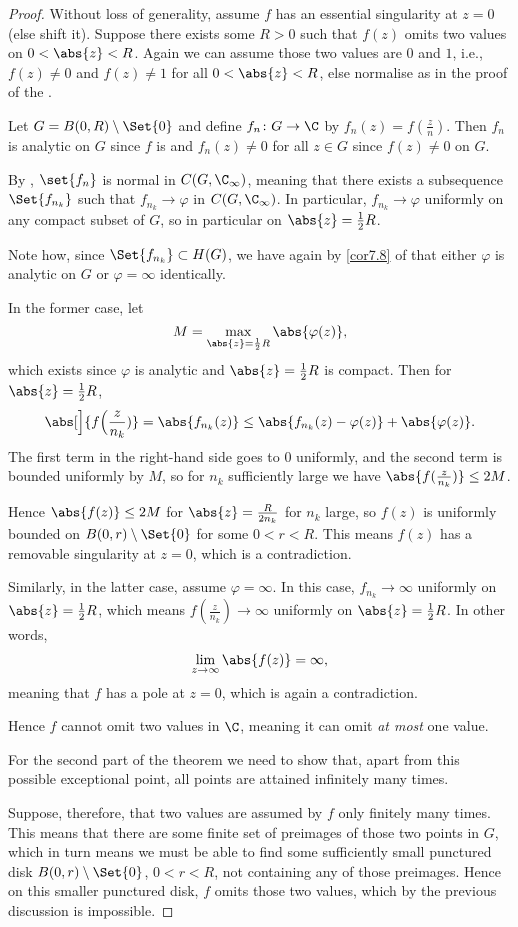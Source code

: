\begin{proof}
	Without loss of generality, assume $f$ has an essential singularity at $z = 0$ (else shift it).
	Suppose there exists some $R > 0$ such that $f(z)$ omits two values on $0 < \abs{z} < R$.
	Again we can assume those two values are $0$ and $1$, i.e., $f(z) \neq 0$ and $f(z) \neq 1$ for all $0 < \abs{z} < R$, else normalise as in the proof of the .

	Let $G = B(0, R) \setminus \Set{0}$ and define $f_n \colon G \to \C$ by $f_n(z) = f(\frac{z}{n})$.
	Then $f_n$ is analytic on $G$ since $f$ is and $f_n(z) \neq 0$ for all $z \in G$ since $f(z) \neq 0$ on $G$.

	By , $\set{f_n}$ is normal in $C(G, \C_\infty)$, meaning that there exists a subsequence $\Set{f_{n_k}}$ such that $f_{n_k} \to \varphi$ in $C(G, \C_\infty)$.
	In particular, $f_{n_k} \to \varphi$ uniformly on any compact subset of $G$, so in particular on $\abs{z} = \frac{1}{2} R$.

	Note how, since $\Set{f_{n_k}} \subset H(G)$, we have again by \autoref{cor7.8} of  that either $\varphi$ is analytic on $G$ or $\varphi = \infty$ identically.

	In the former case, let
	\[
		M = \max_{\abs{z} = \frac{1}{2} R} \abs{\varphi(z)},
	\]
	which exists since $\varphi$ is analytic and $\abs{z} = \frac{1}{2} R$ is compact.
	Then for $\abs{z} = \frac{1}{2} R$,
	\[
		\abs[\Big]{f\Bigl( \frac{z}{n_k})} = \abs{f_{n_k}(z)} \leq \abs{f_{n_k}(z) - \varphi(z)} + \abs{\varphi(z)}.
	\]
	The first term in the right-hand side goes to $0$ uniformly, and the second term is bounded uniformly by $M$, so for $n_k$ sufficiently large we have $\abs{f(\frac{z}{n_k})} \leq 2 M$.

	Hence $\abs{f(z)} \leq 2 M$ for $\abs{z} = \frac{R}{2 n_k}$ for $n_k$ large, so $f(z)$ is uniformly bounded on $B(0, r) \setminus \Set{0}$ for some $0 < r < R$.
	This means $f(z)$ has a removable singularity at $z = 0$, which is a contradiction.

	Similarly, in the latter case, assume $\varphi = \infty$.
	In this case, $f_{n_k} \to \infty$ uniformly on $\abs{z} = \frac{1}{2} R$, which means $f(\frac{z}{n_k}) \to \infty$ uniformly on $\abs{z} = \frac{1}{2} R$.
	In other words,
	\[
		\lim_{z \to \infty} \abs{f(z)} = \infty,
	\]
	meaning that $f$ has a pole at $z = 0$, which is again a contradiction.

	Hence $f$ cannot omit two values in $\C$, meaning it can omit \emph{at most} one value.

	For the second part of the theorem we need to show that, apart from this possible exceptional point, all points are attained infinitely many times.

	Suppose, therefore, that two values are assumed by $f$ only finitely many times.
	This means that there are some finite set of preimages of those two points in $G$, which in turn means we must be able to find some sufficiently small punctured disk $B(0, r) \setminus \Set{0}$, $0 < r < R$, not containing any of those preimages.
	Hence on this smaller punctured disk, $f$ omits those two values, which by the previous discussion is impossible.
\end{proof}


